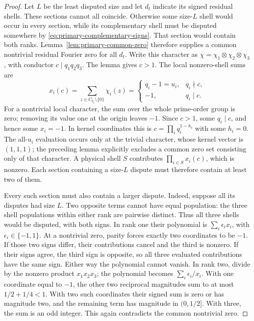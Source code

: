 \documentclass[11pt]{article}
\numberwithin{equation}{section}
\theoremstyle{definition}
\theoremstyle{remark}
\begin{document}
\begin{proof}
Let \(L\) be the least disputed size and let \(d_t\) indicate its
signed residual shells. These sections cannot all coincide. Otherwise
some size-\(L\) shell would occur in every section, while its
complementary shell must be disputed somewhere by
\eqref{eq:primary-complementary-signs}. That section would contain
both ranks. Lemma~\ref{lem:primary-common-zero} therefore supplies a
common nontrivial residual Fourier zero for all \(d_t\).
Write this character as \(\chi=\chi_1\otimes\chi_2\otimes\chi_3\),
with conductor \(c\mid q_1q_2q_3\). The lemma gives \(c>1\).
The local nonzero-shell sums are
\[
 x_i(c)=\sum_{z\in C_{q_i}\setminus\{0\}}\chi_i(z)
 =\begin{cases}
 q_i-1=u_i,&q_i\nmid c,\\
 -1,&q_i\mid c.
 \end{cases}
\]
For a nontrivial local character, the sum over the whole prime-order
group is zero; removing its value one at the origin leaves \(-1\).
Since \(c>1\), some \(q_i\mid c\), and hence some \(x_i=-1\).
In kernel coordinates this is \(c=\prod_iq_i^{1-h_i}\) with some
\(h_i=0\). The all-\(u_i\) evaluation occurs only at the trivial
character, whose kernel vector is \((1,1,1)\); the preceding lemma
explicitly excludes a common zero set consisting only of that character.
A physical shell \(S\) contributes \(\prod_{i\in S}x_i(c)\), which
is nonzero. Each section containing a size-\(L\) dispute must therefore
contain at least two of them.

Every such section must also contain a larger dispute. Indeed, suppose
all its disputes had size \(L\). Two opposite terms cannot have equal
population: the three shell populations within either rank are
pairwise distinct. Thus all three shells would be disputed, with both
signs. In rank one their polynomial is
\(\sum_i\epsilon_ix_i\), with \(\epsilon_i\in\{-1,1\}\).
At a nontrivial zero, parity forces exactly two coordinates to be
\(-1\). If those two signs differ, their contributions cancel and
the third is nonzero. If their signs agree, the third sign is opposite,
so all three evaluated contributions have the same sign. Either way
the polynomial cannot vanish. In rank two, divide by the nonzero
product \(x_1x_2x_3\); the polynomial becomes
\(\sum_i\epsilon_i/x_i\). With one coordinate equal to \(-1\),
the other two reciprocal magnitudes sum to at most
\(1/2+1/4<1\). With two such coordinates their signed sum is zero
or has magnitude two, and the remaining term has magnitude in
\((0,1/2]\). With three, the sum is an odd integer. This again
contradicts the common nontrivial zero.


\end{proof}
\end{document}
